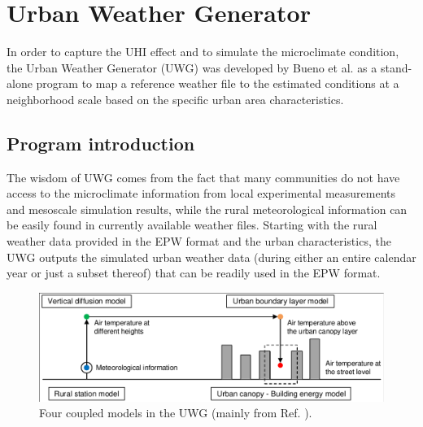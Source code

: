 \chapter{Urban Weather Generator}

%

In order to capture the UHI effect and to simulate the microclimate condition, the Urban Weather Generator (UWG) was developed by Bueno et al. \cite{bueno2013urban} as a stand-alone program to map a reference weather file to the estimated conditions at a neighborhood scale based on the specific urban area characteristics.

\section{Program introduction}

The wisdom of UWG comes from the fact that many communities do not have access to the microclimate information from local experimental measurements and mesoscale simulation results, while the rural meteorological information can be easily found in currently available weather files. Starting with the rural weather data provided in the EPW format and the urban characteristics, the UWG outputs the simulated urban weather data (during either an entire calendar year or just a subset thereof) that can be readily used in the EPW format.

\begin{figure}
\centering
\includegraphics[width=.8\linewidth,trim=2 2 2 2,clip]{UWG.pdf}
\caption{Four coupled models in the UWG (mainly from Ref. \cite{bueno2013urban}).}
\end{figure}


